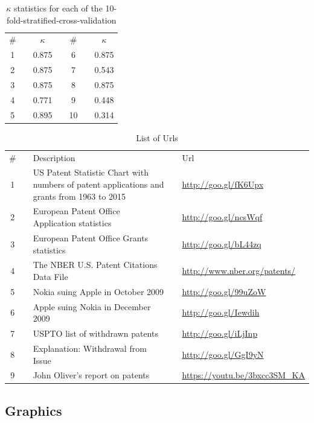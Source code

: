 \documentclass[12pt, a4paper, abstract, parskip]{scrartcl}
\newcommand{\ra}[1]{\renewcommand{\arraystretch}{#1}}
\theoremstyle{definition}
\begin{document}
\begin{table}[!hp]\caption{$\kappa$ statistics for each of the 10-fold-stratified-cross-validation}\label{tab:kappastatistics}\centering\ra{1.3}
\begin{tabular}{cp{1mm}cp{1cm}cp{1mm}c} \toprule
\# & & $\kappa$ & & \# & & $\kappa$\\ \cline{1-1} \cline{3-3} \cline{5-5} \cline{7-7}
1 & & 0.875 & & 6 & & 0.875 \\
2 & & 0.875 & & 7 & & 0.543 \\
3 & & 0.875 & & 8 & & 0.875 \\
4 & & 0.771 & & 9 & & 0.448 \\
5 & & 0.895 & & 10 & & 0.314 \\
\bottomrule
\end{tabular}
\end{table}

\begin{table}[!hp]\caption{List of Urls}\label{tab:url}\centering\ra{1.3}
\begin{tabular}{cp{0.5cm}p{5cm}p{0.5cm}p{5cm}}\toprule
\# & & Description & & Url\\ \cline{1-1} \cline{3-3} \cline{5-5}
1 & & US Patent Statistic Chart with numbers of patent applications and grants from 1963 to 2015 & & \url{http://goo.gl/fK6Upx}\\
2 & & European Patent Office Application statistics & & \url{http://goo.gl/ncsWqf}\\
3 & & European Patent Office Grants statistics & & \url{http://goo.gl/bL44zq}\\
4 & & The NBER U.S. Patent Citations Data File & & \url{http://www.nber.org/patents/}\\
5 & & Nokia suing Apple in October 2009 & & \url{http://goo.gl/99uZoW}\\
6 & & Apple suing Nokia in December 2009 & & \url{http://goo.gl/Iewdih}\\
7 & & USPTO list of withdrawn patents & & \url{http://goo.gl/iLjInp}\\
8 & & Explanation: Withdrawal from Issue & & \url{http://goo.gl/GgI9yN}\\
9 & & John Oliver's report on patents & & \url{https://youtu.be/3bxcc3SM_KA}\\
\bottomrule
\end{tabular}
\end{table}




\newpage

\subsection{Graphics}
\end{document}
